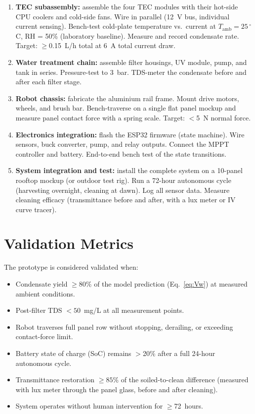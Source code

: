 \documentclass[12pt,a4paper]{report}   %
\begin{document}
\begin{enumerate}[leftmargin=*]
  \item \textbf{TEC subassembly:} assemble the four TEC modules with their hot-side CPU coolers
  and cold-side fans. Wire in parallel (12~V bus, individual current sensing). Bench-test cold-plate
  temperature vs.\ current at $T_{\mathrm{amb}} = 25\,^\circ$C, RH = 50\% (laboratory baseline).
  Measure and record condensate rate. Target: $\geq$0.15~L/h total at 6~A total current draw.
  \item \textbf{Water treatment chain:} assemble filter housings, UV module, pump,
  and tank in series. Pressure-test to 3~bar. TDS-meter the condensate before and after each
  filter stage.
  \item \textbf{Robot chassis:} fabricate the aluminium rail frame. Mount drive motors,
  wheels, and brush bar. Bench-traverse on a single flat panel mockup and measure panel contact
  force with a spring scale. Target: $<$5~N normal force.
  \item \textbf{Electronics integration:} flash the ESP32 firmware (state machine).
  Wire sensors, buck converter, pump, and relay outputs. Connect the MPPT controller and battery.
  End-to-end bench test of the state transitions.
  \item \textbf{System integration and test:} install the complete system on a 10-panel rooftop
  mockup (or outdoor test rig). Run a 72-hour autonomous cycle (harvesting overnight, cleaning at
  dawn). Log all sensor data. Measure cleaning efficacy (transmittance before and after, with a lux
  meter or IV curve tracer).
\end{enumerate}

\section{Validation Metrics}

The prototype is considered validated when:
\begin{itemize}[leftmargin=*]
  \item Condensate yield $\geq 80\%$ of the model prediction (Eq.~\eqref{eq:Vw}) at measured
  ambient conditions.
  \item Post-filter TDS $< 50$~mg/L at all measurement points.
  \item Robot traverses full panel row without stopping, derailing, or exceeding contact-force
  limit.
  \item Battery state of charge (SoC) remains $>$20\% after a full 24-hour autonomous cycle.
  \item Transmittance restoration $\geq 85\%$ of the soiled-to-clean difference (measured with
  lux meter through the panel glass, before and after cleaning).
  \item System operates without human intervention for $\geq$72~hours.
\end{itemize}
\end{document}
